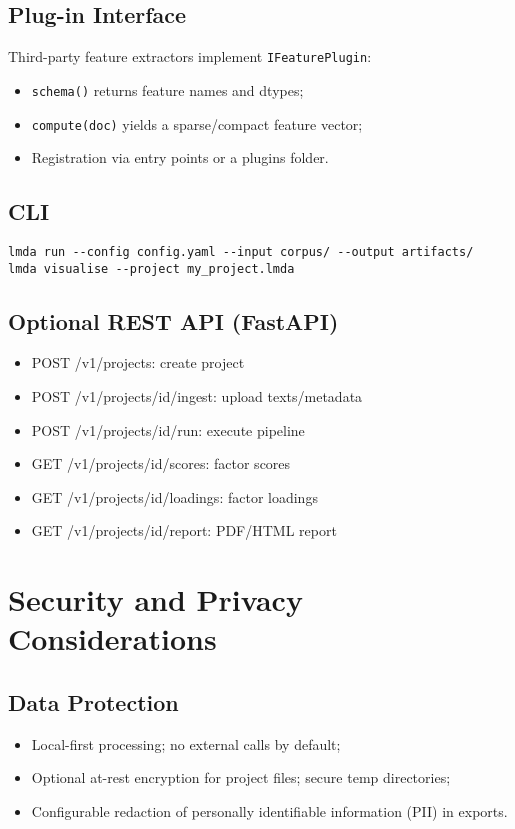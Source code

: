 \subsection{Plug-in Interface}
Third-party feature extractors implement \texttt{IFeaturePlugin}:
\begin{itemize}
    \item \texttt{schema()} returns feature names and dtypes;
    \item \texttt{compute(doc)} yields a sparse/compact feature vector;
    \item Registration via entry points or a plugins folder.
\end{itemize}

\subsection{CLI}
\begin{verbatim}
lmda run --config config.yaml --input corpus/ --output artifacts/
lmda visualise --project my_project.lmda
\end{verbatim}

\subsection{Optional REST API (FastAPI)}
\begin{itemize}
    \item POST /v1/projects: create project
    \item POST /v1/projects/{id}/ingest: upload texts/metadata
    \item POST /v1/projects/{id}/run: execute pipeline
    \item GET /v1/projects/{id}/scores: factor scores
    \item GET /v1/projects/{id}/loadings: factor loadings
    \item GET /v1/projects/{id}/report: PDF/HTML report
\end{itemize}

\section{Security and Privacy Considerations}
\subsection{Data Protection}
\begin{itemize}
    \item Local-first processing; no external calls by default;
    \item Optional at-rest encryption for project files; secure temp directories;
    \item Configurable redaction of personally identifiable information (PII) in exports.
\end{itemize}

